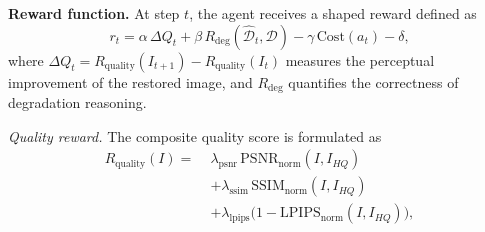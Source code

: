 
\noindent\textbf{Reward function.}
At step $t$, the agent receives a shaped reward defined as
\begin{equation}
\label{eq:reward_total_main}
r_t=\alpha\,\Delta Q_t+\beta\,R_{\text{deg}}(\hat{\mathcal D}_t,\mathcal D)-\gamma\,\mathrm{Cost}(a_t)-\delta,
\end{equation}
where $\Delta Q_t = R_{\text{quality}}(I_{t+1})-R_{\text{quality}}(I_t)$ measures the perceptual improvement of the restored image, and $R_{\text{deg}}$ quantifies the correctness of degradation reasoning.

\vspace{3pt}
\noindent\textit{Quality reward.}
The composite quality score is formulated as
\[
\begin{aligned}
R_{\text{quality}}(I) =\;
&\lambda_{\text{psnr}}\,\mathrm{PSNR}_{\text{norm}}(I,I_{HQ}) \\
&+\lambda_{\text{ssim}}\,\mathrm{SSIM}_{\text{norm}}(I,I_{HQ}) \\
&+\lambda_{\text{lpips}}\big(1-\mathrm{LPIPS}_{\text{norm}}(I,I_{HQ})\big),
\end{aligned}
\]

